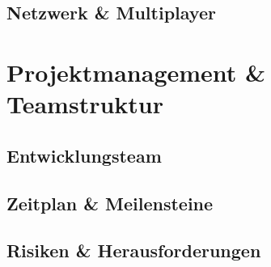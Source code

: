 \documentclass[11pt, a4paper]{article} %
\begin{document}
\subsection{Netzwerk \& Multiplayer}

\newpage

\section{Projektmanagement \& Teamstruktur}
\subsection{Entwicklungsteam}
\subsection{Zeitplan \& Meilensteine}
\subsection{Risiken \& Herausforderungen}
\end{document}

